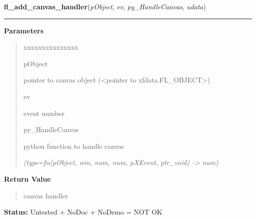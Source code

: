 \hspace{.8\funcindent}\begin{boxedminipage}{\funcwidth}

    \raggedright \textbf{fl\_add\_canvas\_handler}(\textit{pObject}, \textit{ev}, \textit{py\_HandleCanvas}, \textit{udata})

    \vspace{-1.5ex}

    \rule{\textwidth}{0.5\fboxrule}
\setlength{\parskip}{2ex}
\setlength{\parskip}{1ex}
      \textbf{Parameters}
      \vspace{-1ex}

      \begin{quote}
        \begin{Ventry}{xxxxxxxxxxxxxxx}

          \item[pObject]

          pointer to canvas object ({\textless}pointer to 
          xfdata.FL\_OBJECT{\textgreater})

          \item[ev]

          event number

          \item[py\_HandleCanvas]

          python function to handle canvas

            {\it (type=fn(pObject, win, num, num, pXEvent, ptr\_void) -{\textgreater} num)}

        \end{Ventry}

      \end{quote}

      \textbf{Return Value}
    \vspace{-1ex}

      \begin{quote}
      canvas handler

      \end{quote}

\textbf{Status:} Untested + NoDoc + NoDemo = NOT OK



    \end{boxedminipage}

    \label{xformslib:library:fl_get_canvas_id}

    \vspace{0.5ex}

